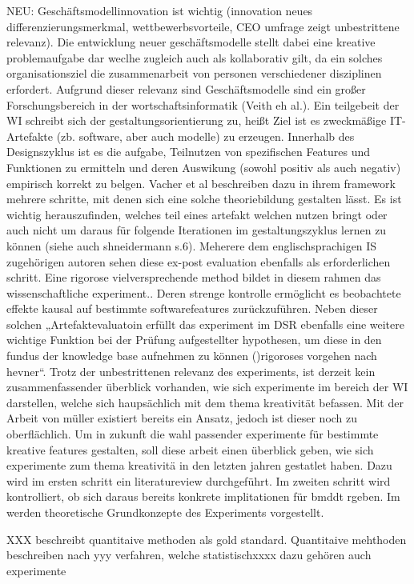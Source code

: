 NEU: Geschäftsmodellinnovation ist wichtig (innovation neues differenzierungsmerkmal, wettbewerbsvorteile, CEO umfrage zeigt unbestrittene relevanz).  Die entwicklung neuer geschäftsmodelle stellt dabei eine kreative problemaufgabe dar weclhe zugleich auch als kollaborativ gilt, da ein solches organisationsziel die zusammenarbeit von personen verschiedener disziplinen erfordert. Aufgrund dieser relevanz sind Geschäftsmodelle sind ein großer Forschungsbereich in der wortschaftsinformatik (Veith eh al.). Ein teilgebeit der WI schreibt sich der gestaltungsorientierung zu, heißt Ziel ist es zweckmäßige IT-Artefakte (zb. software, aber auch modelle) zu erzeugen. Innerhalb des Designszyklus ist es die aufgabe, Teilnutzen von spezifischen Features und Funktionen zu ermitteln und deren Auswikung (sowohl positiv als auch negativ) empirisch korrekt zu belgen. Vacher et al beschreiben dazu in ihrem framework mehrere schritte, mit denen sich eine solche theoriebildung gestalten lässt. Es ist wichtig herauszufinden, welches teil eines artefakt welchen nutzen bringt oder auch nicht um daraus für folgende Iterationen im gestaltungszyklus lernen zu können (siehe auch shneidermann s.6). Meherere dem englischsprachigen IS zugehörigen autoren sehen diese ex-post evaluation ebenfalls als erforderlichen schritt. Eine rigorose vielversprechende method bildet in diesem rahmen das wissenschaftliche experiment.. Deren strenge kontrolle ermöglicht es beobachtete effekte kausal auf bestimmte softwarefeatures zurückzuführen.
Neben dieser solchen „Artefaktevaluatoin erfüllt das experiment im DSR ebenfalls eine weitere wichtige Funktion bei der Prüfung aufgestellter hypothesen, um diese in den fundus der knowledge base aufnehmen zu können ()rigoroses vorgehen nach hevner“.
Trotz der unbestrittenen relevanz des experiments, ist derzeit kein zusammenfassender überblick vorhanden, wie sich experimente im bereich der WI darstellen, welche sich haupsächlich mit dem thema kreativität befassen. Mit der Arbeit von müller existiert bereits ein Ansatz, jedoch ist dieser noch zu oberflächlich.
Um in zukunft die wahl passender experimente für bestimmte kreative features gestalten, soll diese arbeit einen überblick geben, wie sich experimente zum thema kreativitä in den letzten jahren gestatlet haben. Dazu wird im ersten schritt ein literatureview durchgeführt. Im zweiten schritt wird kontrolliert, ob sich daraus bereits konkrete implitationen für bmddt rgeben. Im werden theoretische Grundkonzepte des Experiments vorgestellt.

XXX beschreibt quantitaive methoden als gold standard. Quantitaive mehthoden beschreiben nach yyy verfahren, welche statistischxxxx dazu gehören auch experimente



